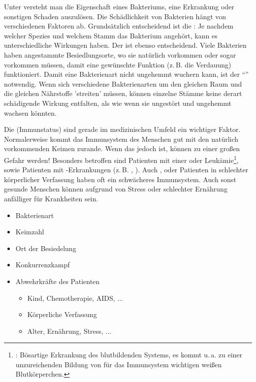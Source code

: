 {%
Unter  versteht man die Eigenschaft eines
Bakteriums, eine Erkrankung oder sonstigen Schaden
auszulösen. Die Schädlichkeit von Bakterien hängt von
verschiedenen Faktoren ab. Grundsätzlich entscheidend ist
die : Je nachdem welcher Spezies und
welchem Stamm das Bakterium angehört, kann es
unterschiedliche Wirkungen haben. Der  ist ebenso entscheidend. Viele Bakterien haben
angestammte Besiedlungsorte, wo sie natürlich vorkommen oder
sogar vorkommen müssen, damit eine gewünschte Funktion
(z.\,B. die Verdauung) funktioniert. Damit eine Bakterienart
nicht ungehemmt wuchern kann, ist der
\enquote{} notwendig. Wenn
sich verschiedene Bakterienarten um den gleichen Raum und
die gleichen Nährstoffe 'streiten' müssen, können einzelne
Stämme keine derart schädigende Wirkung entfalten, als wie
wenn sie ungestört und ungehemmt wachsen könnten.

Die  (Immunstatus) sind
gerade im medizinischen Umfeld ein wichtiger Faktor.
Normalerweise kommt das Immunsystem des Menschen gut mit den
natürlich vorkommenden Keimen zurande. Wenn das
 jedoch  ist,
können   zu einer großen Gefahr
werden! Besonders betroffen sind Patienten mit einer
 oder
Leukämie\footnote{:
Bösartige Erkrankung des blutbildenden Systems, es kommt
u.\,a. zu einer unzureichenden Bildung von für das
Immunsystem wichtigen weißen Blutkörperchen.}, sowie
Patienten mit -Erkrankungen (z.\,B.
, ). Auch ,
 oder Patienten in schlechter
körperlicher Verfassung haben oft ein schwächeres
Immunsystem. Auch sonst gesunde Menschen können aufgrund von
Stress oder schlechter Ernährung anfälliger für Krankheiten
sein.
}{
\begin{itemize}
  \item Bakterienart
  \item Keimzahl
  \item Ort der Besiedelung
  \item Konkurrenzkampf
  \item Abwehrkräfte des Patienten
  \begin{itemize}
    \item Kind, Chemotherapie, AIDS, ...
    \item Körperliche Verfassung
    \item Alter, Ernährung, Stress, ...
  \end{itemize}
\end{itemize}
}


